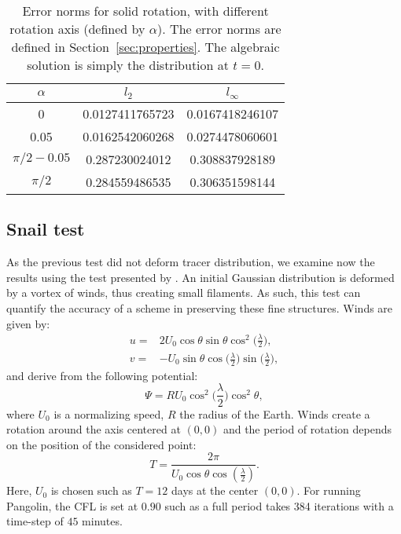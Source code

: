 \begin{table}
  \centering
  \caption{Error norms for solid rotation, with different rotation axis (defined
    by $\alpha$). The error norms are defined in
    Section~\ref{sec:properties}. The algebraic solution is simply the
  distribution at $t=0$.}
  \label{tab:solid_rot}
  \begin{tabular}{ccc}
    \toprule
    $\alpha$ & $l_2$ & $l_{\infty}$\\
    \midrule 
    0 & 0.0127411765723 & 0.0167418246107 \\
    0.05 & 0.0162542060268 & 0.0274478060601 \\
    $\pi/2-0.05$ & 0.287230024012 & 0.308837928189 \\
    $\pi/2$ & 0.284559486535 & 0.306351598144 \\
    \bottomrule
  \end{tabular}
\end{table}


\subsection{Snail test}
As the previous test did not deform tracer distribution, we examine now the
results using the test presented by \cite{Hourdin1999}.  An initial Gaussian
distribution is deformed by a vortex of winds, thus creating small filaments. As
such, this test can quantify the accuracy of a scheme in preserving these fine
structures. Winds are given by:
\begin{align}
  u =& 2 U_0 \cos{\theta} \sin{\theta} \cos^2 \Big(\frac{\lambda}{2}\Big), \\
  v =& -U_0 \sin{\theta} \cos \Big(\frac{\lambda}{2}\Big) 
  \sin \Big(\frac{\lambda}{2} \Big),
\end{align}
and derive from the following potential:
\begin{equation}
  \Psi = 
  R U_0 \cos^2 \Big(\frac{\lambda}{2}\Big) \cos^2{\theta},
  \label{eqn:potential}
\end{equation}
where $U_0$ is a normalizing speed, $R$ the radius of the Earth.
Winds create a rotation around the axis centered at $(0,0)$ and the period of
rotation depends on the position of the considered point:
\begin{equation*}
  T = \frac{2\pi}{U_0 \cos \theta \cos(\frac{\lambda}{2})}.
\end{equation*}
Here, $U_0$ is chosen such as $T=12$ days at the center $(0, 0)$. For running Pangolin,
the CFL is set at $0.90$ such as a full period takes 384 iterations with a
time-step of $45$ minutes.

